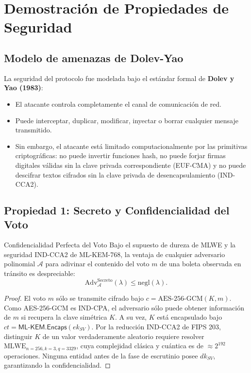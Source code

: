 \documentclass[11pt,a4paper,twoside,openright]{book}
\theoremstyle{plain}
\theoremstyle{definition}
\theoremstyle{remark}
\newcommand{\MLKEM}{\textsf{ML-KEM}}
\newcommand{\Encaps}{\mathsf{Encaps}}
\begin{document}
\chapter{Demostraci\'on de Propiedades de Seguridad}
\label{chap:seguridad_propiedades}

\section{Modelo de amenazas de Dolev-Yao}

La seguridad del protocolo fue modelada bajo el est\'andar formal de \textbf{Dolev y Yao (1983)}:
\begin{itemize}
  \item El atacante controla completamente el canal de comunicaci\'on de red.
  \item Puede interceptar, duplicar, modificar, inyectar o borrar cualquier mensaje transmitido.
  \item Sin embargo, el atacante est\'a limitado computacionalmente por las primitivas criptogr\'aficas: no puede invertir funciones hash, no puede forjar firmas digitales v\'alidas sin la clave privada correspondiente (EUF-CMA) y no puede descifrar textos cifrados sin la clave privada de desencapsulamiento (IND-CCA2).
\end{itemize}

\section{Propiedad 1: Secreto y Confidencialidad del Voto}

\begin{miteo}{Confidencialidad Perfecta del Voto}
Bajo el supuesto de dureza de MLWE y la seguridad IND-CCA2 de \MLKEM{}-768, la ventaja de cualquier adversario polinomial $\mathcal{A}$ para adivinar el contenido del voto $m$ de una boleta observada en tr\'ansito es despreciable:
\[
  \mathrm{Adv}_{\mathcal{A}}^{\mathrm{Secreto}}(\lambda) \leq \mathrm{negl}(\lambda).
\]
\end{miteo}
\begin{proof}
El voto $m$ s\'olo se transmite cifrado bajo $c = \mathrm{AES}\text{-}256\text{-}\mathrm{GCM}(K, m)$. Como AES-256-GCM es IND-CPA, el adversario s\'olo puede obtener informaci\'on de $m$ si recupera la clave sim\'etrica $K$. A su vez, $K$ est\'a encapsulado bajo $ct = \MLKEM.\Encaps(ek_{SV})$. Por la reducci\'on IND-CCA2 de FIPS 203, distinguir $K$ de un valor verdaderamente aleatorio requiere resolver $\mathrm{MLWE}_{n=256, k=3, q=3329}$, cuya complejidad cl\'asica y cu\'antica es de $\approx 2^{192}$ operaciones. Ninguna entidad antes de la fase de escrutinio posee $dk_{SV}$, garantizando la confidencialidad.
\end{proof}
\end{document}
